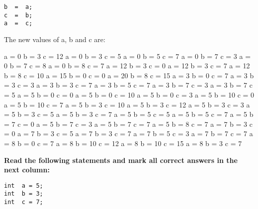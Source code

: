 \documentclass[10pt]{exam}
\begin{document}
\begin{questions}
\begin{minipage}[t][][t]{0.18\textwidth}
\begin{lstlisting}
b  =  a;
c  =  b;
a  =  c;
  \end{lstlisting}
\end{minipage}
  \hfill
\begin{minipage}[t][][t]{0.75\textwidth}
  The new values of a, b and c are:
  \begin{multicols*}{3}
\begin{checkboxes}
    \choice a = 0 b = 3 c = 12
    \choice a = 0 b = 3 c = 5
    \choice a = 0 b = 5 c = 7
    \choice a = 0 b = 7 c = 3
    \choice a = 0 b = 7 c = 8
    \choice a = 0 b = 8 c = 7
    \choice a = 12 b = 3 c = 0
    \choice a = 12 b = 3 c = 7
    \choice a = 12 b = 8 c = 10
    \choice a = 15 b = 0 c = 0
    \choice a = 20 b = 8 c = 15
    \choice a = 3 b = 0 c = 7
    \choice a = 3 b = 3 c = 3
    \choice a = 3 b = 3 c = 7
    \choice a = 3 b = 5 c = 7
    \choice a = 3 b = 7 c = 3
    \choice a = 3 b = 7 c = 5
    \choice a = 5 b = 0 c = 0
    \choice a = 5 b = 0 c = 10
    \choice a = 5 b = 0 c = 3
    \choice a = 5 b = 10 c = 0
    \choice a = 5 b = 10 c = 7
    \choice a = 5 b = 3 c = 10
    \choice a = 5 b = 3 c = 12
    \choice a = 5 b = 3 c = 3
    \choice a = 5 b = 3 c = 5
    \choice a = 5 b = 3 c = 7
    \choice a = 5 b = 5 c = 5
    \choice a = 5 b = 5 c = 7
    \choice a = 5 b = 7 c = 0
    \choice a = 5 b = 7 c = 3
    \choice a = 5 b = 7 c = 7
    \choice a = 5 b = 8 c = 7
    \choice a = 7 b = 3 c = 0
    \choice a = 7 b = 3 c = 5
    \choice a = 7 b = 3 c = 7
    \choice a = 7 b = 5 c = 3
    \choice a = 7 b = 7 c = 7
    \choice a = 8 b = 0 c = 7
    \choice a = 8 b = 10 c = 12
    \choice a = 8 b = 10 c = 15
    \choice a = 8 b = 3 c = 7
  \end{checkboxes}
\end{multicols*}
\end{minipage}

\vspace{1cm}  \begin{minipage}[t][][t]{0.18\textwidth}
\question \bf Read the following statements and mark all correct answers in the next column: \raggedright
  \begin{lstlisting}
int  a = 5;
int  b = 3;
int  c = 7;


\end{lstlisting}
\end{minipage}
\end{questions}
\end{document}
